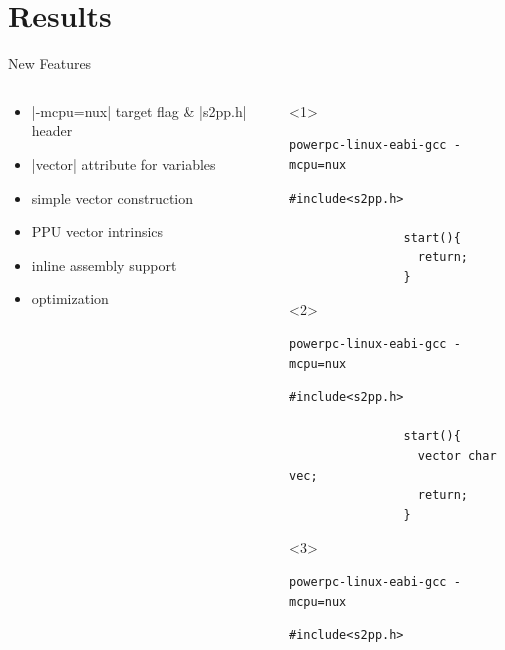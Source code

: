 \documentclass[10pt,aspectratio=169]{beamer}
\begin{document}
\section{Results}
\begin{frame}[fragile]{New Features}
    \begin{columns}[c]
    \begin{column}{0.5\textwidth}
		\begin{itemize}[<+->]
			\setlength\itemsep{1em}
			\item |-mcpu=nux| target flag \& |s2pp.h| header
			\item |vector| attribute for variables
			\item simple vector construction
			\item PPU vector intrinsics
			\item inline assembly support
			\item optimization
        \end{itemize}
    \end{column}

    \begin{column}{0.5\textwidth}
        \centering
		\begin{onlyenv}<1>
				\begin{lstlisting}[title=Compiling Directive]
powerpc-linux-eabi-gcc -mcpu=nux
				\end{lstlisting}
				
				\begin{lstlisting}[title=Example File]
				#include<s2pp.h>
				
				start(){
				  return;
				}
				\end{lstlisting}
				\vspace{5em}
	\end{onlyenv}
		\begin{onlyenv}<2>
				\begin{lstlisting}[title=Compiling Directive]
powerpc-linux-eabi-gcc -mcpu=nux
				\end{lstlisting}
				\begin{lstlisting}[title=Example File]
				#include<s2pp.h>

				start(){
				  vector char vec;
				  return;
				}
				\end{lstlisting}
				\vspace{4em}
	\end{onlyenv}
		\begin{onlyenv}<3>
				\begin{lstlisting}[title=Compiling Directive]
powerpc-linux-eabi-gcc -mcpu=nux
				\end{lstlisting}
				\begin{lstlisting}[title=Example File]
				#include<s2pp.h>


\end{lstlisting}
\end{onlyenv}
\end{column}
\end{columns}
\end{frame}
\end{document}
